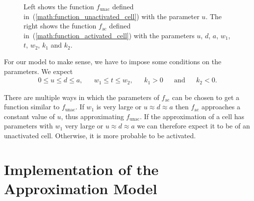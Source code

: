 \begin{figure}[h!]
\begin{subfigure}{0.45\linewidth}
	\end{subfigure}
	
	\caption{Left shows the function $f_{\text{unac}}$ defined in~(\ref{math:function_unactivated_cell}) with the parameter $u$. The right shows the function $f_{\text{ac}}$ defined in~(\ref{math:function_activated_cell}) with the parameters $u$, $d$, $a$, $w_1$, $t$, $w_2$, $k_1$ and $k_2$.}
	\label{fig:typical_time_series_with_parameters}
\end{figure}

For our model to make sense, we have to impose some conditions on the parameters. We expect
\begin{align}
	\label{eq:conditions}
	0 \leq u \leq d \leq a, && w_1 \leq t \leq w_2, && k_1 > 0 && \text{and} && k_2 < 0.
\end{align}

There are multiple ways in which the parameters of $f_{\text{ac}}$ can be chosen to get a function similar to $f_{\text{unac}}$. If $w_1$ is very large or $u \approx d \approx a$ then $f_{\text{ac}}$ approaches a constant value of $u$, thus approximating $f_{\text{unac}}$. If the approximation of a cell has parameters with $w_1$ very large or $u \approx d \approx a$ we can therefore expect it to be of an unactivated cell. Otherwise, it is more probable to be activated.

\newpage
\section{Implementation of the Approximation Model}

